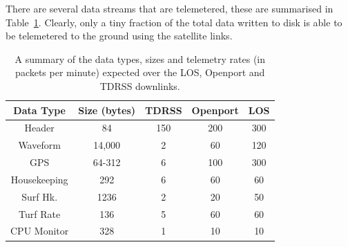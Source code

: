 \documentclass{article}
\begin{document}
There are several data streams that are telemetered, these are summarised in Table~\ref{tab:telem}. Clearly, only a tiny fraction of the total data written to disk is able to be telemetered to the ground using the satellite links.
\begin{table}[hbt]
  \centering

  \begin{tabular}{|c|c|c|c|c|}
    \hline
   Data Type & Size (bytes) & TDRSS  & Openport  & LOS  \\
    \hline 
    Header & 84 & 150 & 200 & 300 \\
    Waveform & 14,000 & 2 & 60 & 120 \\
    GPS & 64-312 & 6 & 100 & 300 \\
    Housekeeping & 292 & 6 & 60 & 60 \\
    Surf Hk. & 1236 & 2 & 20 & 50 \\
    Turf Rate & 136 & 5 & 60 & 60 \\
    CPU Monitor & 328 & 1 & 10 & 10 \\
    \hline
  \end{tabular}
  \caption{A summary of the data types, sizes and telemetry rates (in packets per minute) expected over the LOS, Openport and TDRSS downlinks.}
  \label{tab:telem}
\end{table}
\end{document}
